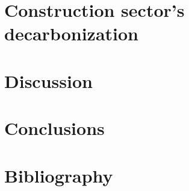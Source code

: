 \documentclass[10pt,twoside]{book}
\begin{document}

\clearpage

\chapter{Construction sector's decarbonization}
\clearpage


\clearpage

\chapter{Discussion}
\clearpage
% 
\clearpage

\chapter{Conclusions}
\clearpage
% 

\chapter{Bibliography}
\clearpage
\begin{multicols}{2}
\printbibliography[heading=none]
\end{multicols}
\end{document}
